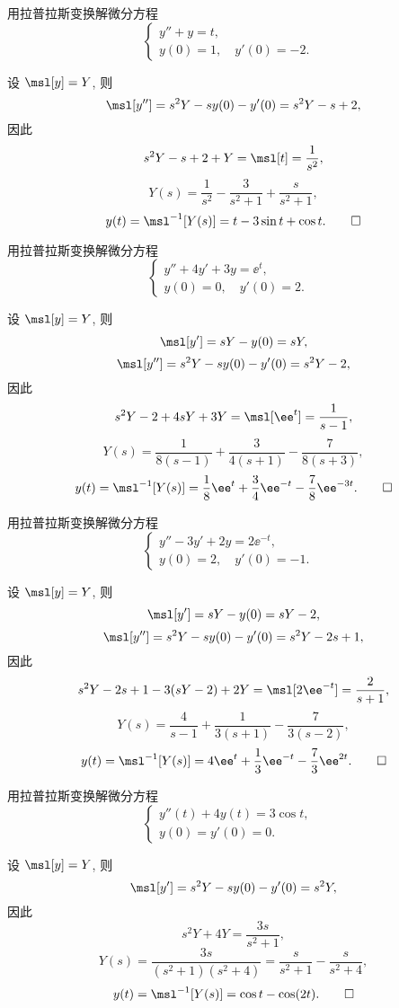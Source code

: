 \begin{exercise}
用拉普拉斯变换解微分方程
\[\begin{cases}y''+y=t,&\\y(0)=1,\quad y'(0)=-2.\end{cases}\]
\end{exercise}
\begin{solution}
设 $\msl[y]=Y$, 则
\[\msl[y'']=s^2Y-sy(0)-y'(0)=s^2Y-s+2,\]
因此
\[s^2Y-s+2+Y=\msl[t]=\frac{1}{s^2},\]
\[Y(s)=\frac1{s^2}-\frac3{s^2+1}+\frac s{s^2+1},\]
\[y(t)=\msl^{-1}[Y(s)]=t-3\sin t+\cos t. \qedhere\]
\end{solution}


\begin{exercise}
用拉普拉斯变换解微分方程
\[\begin{cases}y''+4y'+3y=\ee^t,&\\y(0)=0,\quad y'(0)=2.\end{cases}\]
\end{exercise}
\begin{solution}
设 $\msl[y]=Y$, 则
\[\msl[y']=sY-y(0)=sY,\]
\[\msl[y'']=s^2Y-sy(0)-y'(0)=s^2Y-2,\]
因此
\[s^2Y-2+4sY+3Y=\msl[\ee^t]=\frac{1}{s-1},\]
\[Y(s)=\frac{1}{8(s-1)}+\frac{3}{4(s+1)}-\frac7{8(s+3)},\]
\[y(t)=\msl^{-1}[Y(s)]=\frac18\ee^t+\frac34 \ee^{-t}-\frac78 \ee^{-3t}. \qedhere\]
\end{solution}


\begin{exercise}
用拉普拉斯变换解微分方程
\[\begin{cases}y''-3y'+2y=2\ee^{-t},&\\y(0)=2,\quad y'(0)=-1.\end{cases}\]
\end{exercise}
\begin{solution}
设 $\msl[y]=Y$, 则
\[\msl[y']=sY-y(0)=sY-2,\]
\[\msl[y'']=s^2Y-sy(0)-y'(0)=s^2Y-2s+1,\]
因此
\[s^2Y-2s+1-3(sY-2)+2Y=\msl[2\ee^{-t}]=\frac{2}{s+1},\]
\[Y(s)=\frac{4}{s-1}+\frac{1}{3(s+1)}-\frac7{3(s-2)},\]
\[y(t)=\msl^{-1}[Y(s)]=4\ee^t+\frac13 \ee^{-t}-\frac73\ee^{2t}. \qedhere\]
\end{solution}


\begin{exercise}
用拉普拉斯变换解微分方程
\[\begin{cases}y''(t)+4y(t)=3\cos t,& \\y(0)=y'(0)=0.&\end{cases}\]
\end{exercise}
\begin{solution}
设 $\msl[y]=Y$, 则
\[\msl[y']=s^2Y-sy(0)-y'(0)=s^2Y,\]
因此
\[s^2Y+4Y=\frac{3s}{s^2+1},\]
\[Y(s)=\frac{3s}{(s^2+1)(s^2+4)}=\frac{s}{s^2+1}-\frac{s}{s^2+4},\]
\[y(t)=\msl^{-1}[Y(s)]=\cos t-\cos(2t).\qedhere\]
\end{solution}




